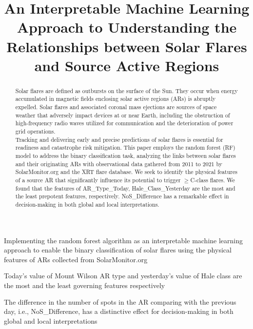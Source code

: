 \documentclass[draft]{agujournal2019}
\begin{document}
\title{An Interpretable Machine Learning Approach to Understanding the Relationships between Solar Flares and Source Active Regions}



\begin{keypoints}

\item Implementing the random forest algorithm as an interpretable machine learning approach to enable the binary classification of solar flares using the physical features of ARs collected from SolarMonitor.org
\item Today's value of Mount Wilson AR type and yesterday's value of Hale class are the most and the least governing features respectively
\item The difference in the number of spots in the AR comparing with the previous day,
i.e., NoS\_Difference,
has a distinctive effect for decision-making in both global and local interpretations
\end{keypoints}

\begin{abstract}
Solar flares are defined as outbursts on the surface of the Sun. They occur when energy accumulated in magnetic fields enclosing solar active regions (ARs) is abruptly expelled. Solar flares and associated coronal mass ejections are sources of space weather that adversely impact devices at or near Earth, including the obstruction of high-frequency radio waves utilized for communication and the deterioration of power grid operations. \\
Tracking and delivering early and precise predictions of solar flares is essential for readiness and catastrophe risk mitigation. This paper employs the random forest (RF) model to address the binary classification task, analyzing the links between solar flares and their originating ARs with observational data gathered from 2011 to 2021 by SolarMonitor.org and the XRT flare database. We seek to identify the physical features of a source AR that significantly influence its potential to trigger $\geq$C-class flares.
We found that the features of AR\_Type\_Today,  Hale\_Class\_Yesterday are the most and the least prepotent features, respectively. NoS\_Difference has a remarkable effect in decision-making in both global and local interpretations.
\end{abstract}
\end{document}
